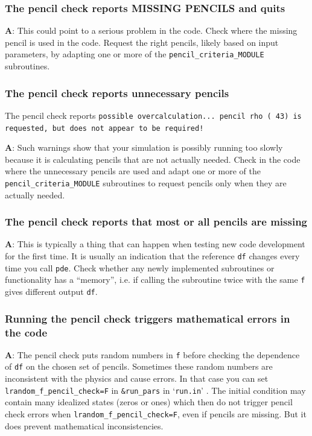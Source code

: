 \documentclass[\mydriver,12pt,twoside,notitlepage,a4paper]{article}
\makeatletter
\newcommand{\code}[1]{\texttt{#1}}
\newcommand{\file}[2][]{%
  \def\index@{#1}%
  `\texttt{#2}'%
  \ifx\index@\@empty\index[file]{#2@\texttt{#2}}%
  \else\index[file]{#1@\texttt{#1}}%
  \fi%
}
\makeatother
\begin{document}
\subsubsection{The pencil check reports MISSING PENCILS and quits}

\medskip

{\bf A}: This could point to a serious problem in the code. Check where the
missing pencil is used in the code. Request the right pencils, likely based on
input parameters, by adapting one or more of the \code{pencil_criteria_MODULE}
subroutines.

\subsubsection{The pencil check reports unnecessary pencils}

The pencil check reports
\code{possible overcalculation... pencil rho (  43) is requested, but does not
appear to be required!}

\medskip

{\bf A}: Such warnings show that your simulation is possibly running too slowly
because it is calculating pencils that are not actually needed. Check in the
code where the unnecessary pencils are used and adapt one or more of the
\code{pencil_criteria_MODULE} subroutines to request pencils only when they are
actually needed.

\subsubsection{The pencil check reports that most or all pencils are missing}

\medskip

{\bf A}: This is typically a thing that can happen when testing new code
development for the first time. It is usually an indication that the reference
\code{df} changes every time you call \code{pde}. Check whether any newly
implemented subroutines or functionality has a ``memory'', i.e. if calling the
subroutine twice with the same \code{f} gives different output \code{df}.

\subsubsection{Running the pencil check triggers mathematical errors in the code}

{\bf A}: The pencil check puts random numbers in \code{f} before checking the
dependence of \code{df} on the chosen set of pencils. Sometimes these random
numbers are inconsistent with the physics and cause errors. In that case you
can set \code{lrandom_f_pencil_check=F} in \code{\&run_pars} in \file{run.in}.
The initial condition may contain many idealized states (zeros or ones) which
then do not trigger pencil check errors when \code{lrandom_f_pencil_check=F},
even if pencils are missing. But it does prevent mathematical inconsistencies.
\end{document}
